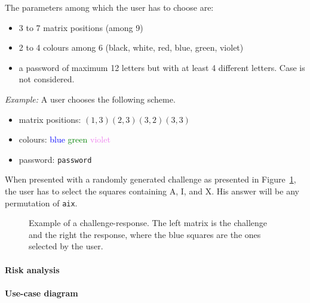 \documentclass[11pt,a4paper]{article}
\begin{document}
The parameters among which the user has to choose are:
\begin{itemize}
\item 3 to 7 matrix positions (among 9)
\item 2 to 4 colours among 6 (black, white, red, blue, green, violet)
\item a password of maximum 12 letters but with at least 4 different letters. Case is not considered.
\end{itemize}

\textit{Example:} A user chooses the following scheme.
\begin{itemize}
\item matrix positions: $(1,3) (2,3) (3,2) (3,3)$
\item colours: \textcolor{blue}{blue} \textcolor{green}{green} \textcolor{violet}{violet}
\item password: \texttt{password}
\end{itemize}

When presented with a randomly generated challenge as presented in Figure~\ref{fig:ex1}, the user has to select the squares containing A, I, and X. His answer will be any permutation of \texttt{aix}.
\begin{figure}
\centering
{}
\caption{Example of a challenge-response. The left matrix is the challenge and the right the response, where the blue squares are the ones selected by the user.}
\label{fig:ex1}
\end{figure}

\paragraph{Risk analysis}

\paragraph{Use-case diagram}
\end{document}
